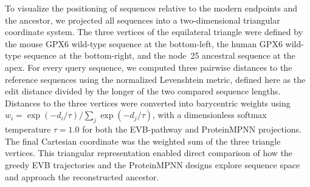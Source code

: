 To visualize the positioning of sequences relative to the modern endpoints and the ancestor, we projected all sequences into a two-dimensional triangular coordinate system. The three vertices of the equilateral triangle were defined by the mouse GPX6 wild-type sequence at the bottom-left, the human GPX6 wild-type sequence at the bottom-right, and the node~25 ancestral sequence at the apex. For every query sequence, we computed three pairwise distances to the reference sequences using the normalized Levenshtein metric,\cite{LiLiu2007NormalizedLevenshtein} defined here as the edit distance divided by the longer of the two compared sequence lengths. Distances to the three vertices were converted into barycentric weights using $w_i=\exp(-d_i/\tau)/\sum_j\exp(-d_j/\tau)$, with a dimensionless softmax temperature $\tau=1.0$ for both the EVB-pathway and ProteinMPNN projections. The final Cartesian coordinate was the weighted sum of the three triangle vertices. This triangular representation enabled direct comparison of how the greedy EVB trajectories and the ProteinMPNN designs explore sequence space and approach the reconstructed ancestor.
